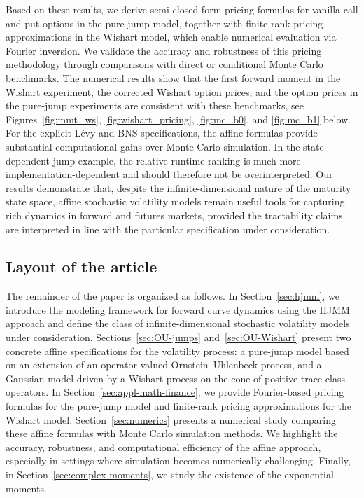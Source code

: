 \documentclass[10pt,a4paper,reqno]{amsart}
\numberwithin{equation}{section}
\theoremstyle{plain}
\theoremstyle{definition}
\theoremstyle{example}
\begin{document}
Based on these results, we derive semi-closed-form pricing formulas for vanilla call and put options in the pure-jump model, together with finite-rank pricing approximations in the Wishart model, which enable numerical evaluation via Fourier inversion. We validate the accuracy and robustness of this pricing methodology through comparisons with direct or conditional Monte Carlo benchmarks. The numerical results show that the first forward moment in the Wishart experiment, the corrected Wishart option prices, and the option prices in the pure-jump experiments are consistent with these benchmarks, see Figures~\ref{fig:mmt_ws}, \ref{fig:wishart_pricing}, \ref{fig:mc_b0}, and \ref{fig:mc_b1} below. For the explicit L\'evy and BNS specifications, the affine formulas provide substantial computational gains over Monte Carlo simulation. In the state-dependent jump example, the relative runtime ranking is much more implementation-dependent and should therefore not be overinterpreted. Our results demonstrate that, despite the infinite-dimensional nature of the maturity state space, affine stochastic volatility models remain useful tools for capturing rich dynamics in forward and futures markets, provided the tractability claims are interpreted in line with the particular specification under consideration.

\subsection{Layout of the article}

The remainder of the paper is organized as follows. In Section~\ref{sec:hjmm}, we introduce the modeling framework for forward curve dynamics using the HJMM approach and define the class of infinite-dimensional stochastic volatility models under consideration. Sections~\ref{sec:OU-jumps} and~\ref{sec:OU-Wishart} present two concrete affine specifications for the volatility process: a pure-jump model based on an extension of an operator-valued Ornstein–Uhlenbeck process, and a Gaussian model driven by a Wishart process on the cone of positive trace-class operators. In Section~\ref{sec:appl-math-finance}, we provide Fourier-based pricing formulas for the pure-jump model and finite-rank pricing approximations for the Wishart model. Section~\ref{sec:numerics} presents a numerical study comparing these affine formulas with Monte Carlo simulation methods. We highlight the accuracy, robustness, and computational efficiency of the affine approach, especially in settings where simulation becomes numerically challenging. Finally, in Section~\ref{sec:complex-moments}, we study the existence of the exponential moments. 
\end{document}
